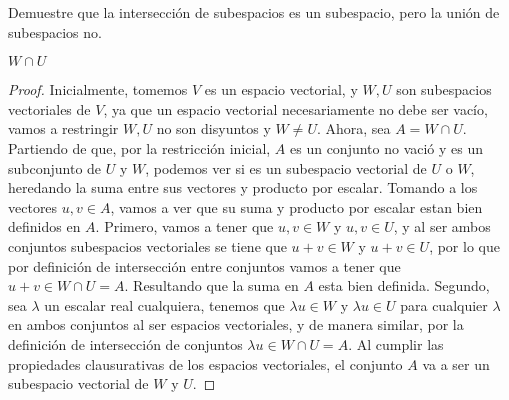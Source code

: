 \item Demuestre que la intersección de subespacios es un subespacio, pero la unión de subespacios no.
    \ResetCases{}
    \begin{mathcase}{\(W \cap U\)}
        \begin{proof}
            Inicialmente, tomemos \(V\) es un espacio vectorial, y \(W, U\) son subespacios vectoriales de \(V\), 
            ya que un espacio vectorial necesariamente no debe ser vacío, vamos a restringir \(W, U\) no son disyuntos y \(W \neq U\). 
            Ahora, sea \(A = W \cap U\).
            Partiendo de que, por la restricción inicial, \(A\) es un conjunto no vació y es un subconjunto de \(U\) y \(W\), 
            podemos ver si es un subespacio vectorial de \(U\) o \(W\), heredando la suma entre sus vectores y producto por escalar.
            Tomando a los vectores \(u, v \in A\), vamos a ver que su suma y producto por escalar estan bien definidos en \(A\). 
            Primero, vamos a tener que \(u, v \in W\) y \(u, v \in U\), y al ser ambos conjuntos subespacios vectoriales se 
            tiene que \(u + v \in W\) y \(u + v \in U\), por lo que por definición de intersección entre conjuntos vamos a tener que \(u + v \in W \cap U = A\).
            Resultando que la suma en \(A\) esta bien definida.
            Segundo, sea \(\lambda\) un escalar real cualquiera, tenemos que \(\lambda u \in W\) y \(\lambda u \in U\) para cualquier \(\lambda\) en ambos conjuntos 
            al ser espacios vectoriales,
            y de manera similar, por la definición de intersección de conjuntos \(\lambda u \in W \cap U = A\).
            Al cumplir las propiedades clausurativas de los espacios vectoriales, el conjunto \(A\) va a ser un subespacio vectorial de \(W\) y \(U\).
        \end{proof}
    \end{mathcase}
